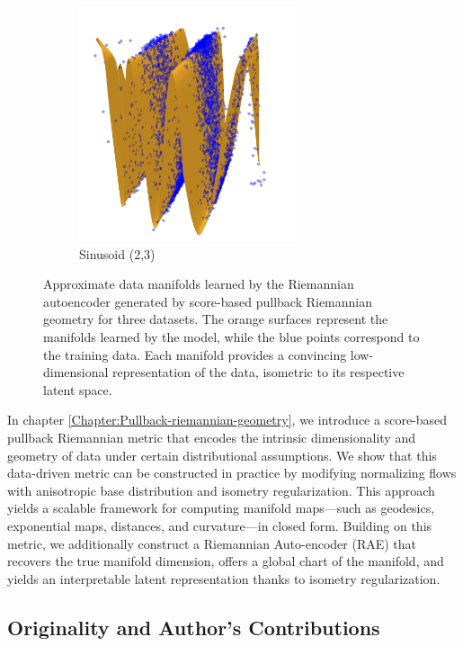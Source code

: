 \begin{figure}[h]
\begin{subfigure}[b]{0.32\textwidth}
        \centering
        \includegraphics[width=0.7\textwidth]{Outline/figures/score-based-riemannian-geometry/sinusoid_2_3.jpg}
        \caption{Sinusoid (2,3)}
    \end{subfigure}

    \caption{
        Approximate data manifolds learned by the Riemannian autoencoder generated by score-based pullback Riemannian geometry for three datasets. The orange surfaces represent the manifolds learned by the model, while the blue points correspond to the training data. Each manifold provides a convincing low-dimensional representation of the data, isometric to its respective latent space.
    }
    \label{fig:learned_charts}
\end{figure}

In chapter \ref{Chapter:Pullback-riemannian-geometry}, we introduce a score-based pullback Riemannian metric that encodes the intrinsic dimensionality and geometry of data under certain distributional assumptions. We show that this data-driven metric can be constructed in practice by modifying normalizing flows with anisotropic base distribution and isometry regularization. This approach yields a scalable framework for computing manifold maps—such as geodesics, exponential maps, distances, and curvature—in closed form. Building on this metric, we additionally construct a Riemannian Auto-encoder (RAE) that recovers the true manifold dimension, offers a global chart of the manifold, and yields an interpretable latent representation thanks to isometry regularization.

\subsection*{Originality and Author’s Contributions}

